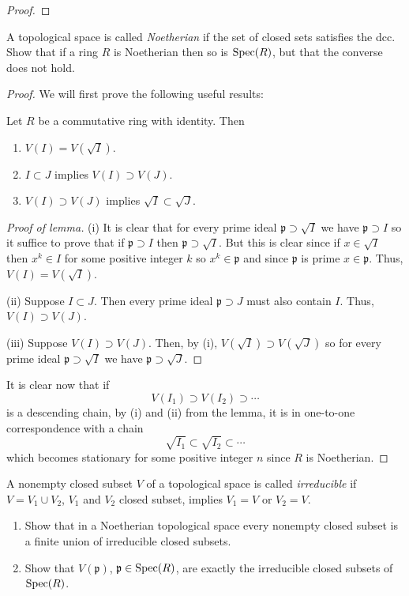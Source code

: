\begin{proof}
\end{proof}
\newpage
\begin{problem}
A topological space is called \emph{Noetherian} if the set of
closed sets satisfies the dcc. Show that if a ring $R$ is
Noetherian then so is $\operatorname{Spec}(R)$, but that the converse does not
hold.
\end{problem}
\begin{proof}
We will first prove the following useful results:
\begin{lemma*}
Let $R$ be a commutative ring with identity. Then
\begin{enumerate}[noitemsep,label=(\roman*)]
\item $V(I)=V(\sqrt{I})$.
\item $I\subset J$ implies $V(I)\supset V(J)$.
\item $V(I)\supset V(J)$ implies $\sqrt{I}\subset\sqrt{J}$.
\end{enumerate}
\end{lemma*}
\begin{proof}[Proof of lemma]
\renewcommand\qedsymbol{$\clubsuit$}
(i) It is clear that for every prime ideal
$\mathfrak{p}\supset\sqrt{I}$ we have $\mathfrak{p}\supset I$ so
it suffice to prove that if $\mathfrak{p}\supset I$ then
$\mathfrak{p}\supset\sqrt{I}$. But this is clear since if
$x\in\sqrt{I}$ then $x^k\in I$ for some positive integer $k$ so
$x^k\in\mathfrak{p}$ and since $\mathfrak{p}$ is prime
$x\in\mathfrak{p}$. Thus, $V(I)=V(\sqrt{I})$.

(ii) Suppose $I\subset J$. Then every prime ideal
$\mathfrak{p}\supset J$ must also contain $I$. Thus, $V(I)\supset
V(J)$.

(iii) Suppose $V(I)\supset V(J)$. Then, by (i),
$V(\sqrt{I})\supset V(\sqrt{J})$ so for every prime ideal
$\mathfrak{p}\supset\sqrt{I}$ we have
$\mathfrak{p}\supset\sqrt{J}$.
\end{proof}
It is clear now that if
\[
V(I_1)\supset V(I_2)\supset\cdots
\]
is a descending chain, by (i) and (ii) from the lemma, it is in
one-to-one correspondence with a chain
\[
\sqrt{I_1}\subset\sqrt{I_2}\subset\cdots
\]
which becomes stationary for some positive integer $n$ since $R$ is
Noetherian.
\end{proof}
\newpage
\begin{problem}
A nonempty closed subset $V$ of a topological space is called
\emph{irreducible} if $V=V_1\cup V_2$, $V_1$ and $V_2$ closed
subset, implies $V_1=V$ or $V_2=V$.
\begin{enumerate}[noitemsep,label=(\alph*)]
\item Show that in a Noetherian topological space every nonempty
  closed subset is a finite union of irreducible closed subsets.
\item Show that $V(\mathfrak{p})$, $\mathfrak{p}\in\operatorname{Spec}(R)$, are
  exactly the irreducible closed subsets of $\operatorname{Spec}(R)$.
\end{enumerate}
\end{problem}
